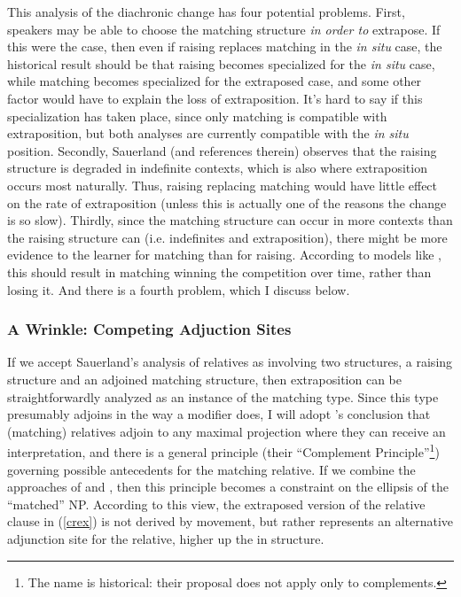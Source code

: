 This analysis of the diachronic change has four potential problems. First, speakers may be able to choose the matching structure \textsl{in order to} extrapose. If this were the case, then even if raising replaces matching in the \textsl{in situ} case, the historical result should be that raising becomes specialized for the \textsl{in situ} case, while matching becomes specialized for the extraposed case, and some other factor would have to explain the loss of extraposition. It's hard to say if this specialization has taken place, since only matching is compatible with extraposition, but both analyses are currently compatible with the \textsl{in situ} position. Secondly, Sauerland (and references therein) observes that the raising structure is degraded in indefinite contexts, which is also where extraposition occurs most naturally. Thus, raising replacing matching would have little effect on the rate of extraposition (unless this is actually one of the reasons the change is so slow). Thirdly, since the matching structure can occur in more contexts than the raising structure can (i.e. indefinites and extraposition), there might be more evidence to the learner for matching than for raising. According to models like \citet{yang2000}, this should result in matching winning the competition over time, rather than losing it. And there is a fourth problem, which I discuss below.


\subsubsection{A Wrinkle: Competing Adjuction Sites}

If we accept Sauerland's analysis of relatives as involving two structures, a raising structure and an adjoined matching structure, then extraposition can be straightforwardly analyzed as an instance of the matching type. Since this type presumably adjoins in the way a modifier does, I will adopt \citet{culicoverrochemont1990}'s conclusion that (matching) relatives adjoin to any maximal projection where they can receive an interpretation, and there is a general principle (their ``Complement Principle''\footnote{The name is historical: their proposal does not apply only to complements.}) governing possible antecedents for the matching relative. If we combine the approaches of \citet{culicoverrochemont1990} and \citet{sauerland2003}, then this principle becomes a constraint on the ellipsis of the ``matched'' NP. According to this view, the extraposed version of the relative clause in (\ref{crex}) is not derived by movement, but rather represents an alternative adjunction site for the relative, higher up the in structure.

